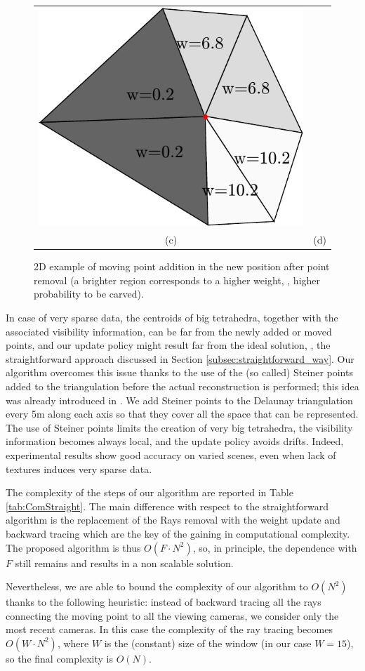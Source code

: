 \begin{figure}[t]
\begin{center}
\begin{tabular}{cc}
\includegraphics[width=0.42\columnwidth]{./img//mooving_min}\\ (c) & (d)\\
\end{tabular}
\end{center}
\caption{2D example of moving point addition in the new position after point removal (a brighter region corresponds to a higher weight, \ie, higher probability to be carved).}
\label{fig:reconstrEx_2}
\end{figure}

In case of very sparse data, the centroids of big tetrahedra, together with the associated visibility information, can be far from the newly added or moved points, and our update policy might result far from the ideal solution, \ie, the straightforward approach discussed in Section \ref{subsec:straightforward_way}. Our algorithm overcomes this issue thanks to the use of the (so called) Steiner points added to the triangulation before the actual reconstruction is performed; this idea was already introduced in \cite{litvinov_lhuillier_13}.
We add Steiner points to the Delaunay triangulation every 5m along each axis so that they cover all the space that can be represented. The use of Steiner points limits the creation of very big tetrahedra, the visibility information becomes always local, and the update policy avoids drifts. Indeed, experimental results show good accuracy on varied scenes, even when lack of textures induces very sparse data.


The complexity of the steps of our algorithm are reported in Table \ref{tab:ComStraight}. The main difference with respect to the straightforward algorithm is the replacement of the Rays removal with the weight update and backward tracing which are the key of the gaining in computational complexity.
The proposed algorithm is thus $O(F\cdot N^2)$, so, in principle, the dependence with $F$ still remains and results in a non scalable solution. 

\label{subsub:window}
Nevertheless, we are able to bound the complexity of our algorithm to $O(N^2)$ thanks to the following heuristic: instead of backward tracing all the rays connecting the moving point to all the viewing cameras, we consider only the most recent cameras.
In this case the complexity of the ray tracing becomes  $O(W\cdot N^2)$, where $W$ is the (constant) size  of the window (in our case $W = 15$), so the final complexity is $O(N)$.



